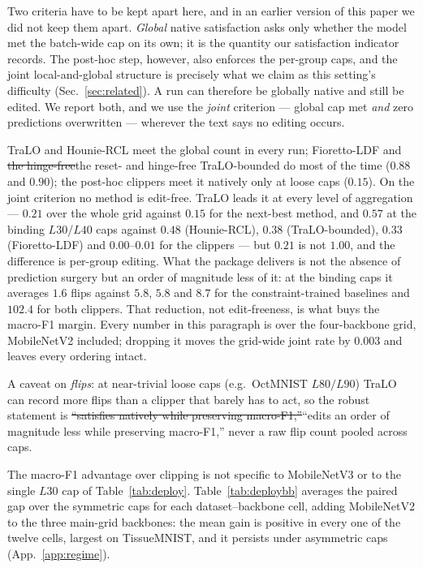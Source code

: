 \documentclass[10pt]{article}
\newcommand{\del}[1]{{\color{red}\sout{#1}}}
\begin{document}
{\color{blue}Two criteria have to be kept apart here, and in an earlier version of
this paper we did not keep them apart. \emph{Global} native satisfaction asks
only whether the model met the batch-wide cap on its own; it is the quantity our
satisfaction indicator records. The post-hoc step, however, also enforces the
per-group caps, and the joint local-and-global structure is precisely what we
claim as this setting's difficulty (Sec.~\ref{sec:related}). A run can therefore
be globally native and still be edited. We report both, and we use the
\emph{joint} criterion --- global cap met \emph{and} zero predictions
overwritten --- wherever the text says no editing occurs.}

TraLO and Hounie-RCL meet the {\color{blue}global} count in every run;
Fioretto-LDF and \del{the hinge-free}{\color{blue}the reset- and hinge-free}
TraLO-bounded do most of the time {\color{blue}($0.88$ and $0.90$)}; the
post-hoc clippers meet it natively only at loose caps
{\color{blue}($0.15$)}.
{\color{blue}On the joint criterion no method is edit-free. TraLO leads it at
every level of aggregation --- $0.21$ over the whole grid against $0.15$ for the
next-best method, and $0.57$ at the binding $L30$/$L40$ caps against $0.48$
(Hounie-RCL), $0.38$ (TraLO-bounded), $0.33$ (Fioretto-LDF) and $0.00$--$0.01$
for the clippers --- but $0.21$ is not $1.00$, and the difference is per-group
editing.
What the package delivers is not the absence of prediction surgery but an order
of magnitude less of it: at the binding caps it averages $1.6$ flips against
$5.8$, $5.8$ and $8.7$ for the constraint-trained baselines and $102.4$ for both
clippers. That reduction, not edit-freeness, is what buys the macro-F1 margin.
Every number in this paragraph is over the four-backbone grid, MobileNetV2
included; dropping it moves the grid-wide joint rate by $0.003$ and leaves
every ordering intact.}

A caveat on
\emph{flips}: at near-trivial loose caps (e.g.\ OctMNIST $L80/L90$)
TraLO can record more flips than a clipper that barely has to act, so
the robust statement is \del{``satisfies natively while preserving
macro-F1,''}{\color{blue}``edits an order of magnitude less while preserving
macro-F1,''} never a raw flip count
{\color{blue}pooled across caps}.

The macro-F1 advantage over clipping is not specific to MobileNetV3 or
to the single $L30$ cap of Table~\ref{tab:deploy}.
Table~\ref{tab:deploybb} averages the paired gap over the symmetric caps
for each dataset--backbone cell, adding MobileNetV2 to the three
main-grid backbones: the mean gain is positive in every one of the
twelve cells, largest on TissueMNIST, and it persists under asymmetric
caps (App.~\ref{app:regime}).
\end{document}

